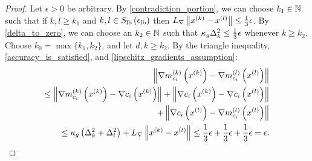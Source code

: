


\begin{proof}

Let $\epsilon > 0$ be arbitrary.
By \cref{contradiction_portion}, we can choose $k_1 \in \mathbb N$ such that if $k, l \ge k_1$ and
$k, l \in {S_{\textrm{lb}}\left(\epsilon_{\textrm{lb}}\right)}$ then ${L_{\nabla}} \left\|x^{(k)} - {x^{(l)}} \right\| \le \frac 1 3 \epsilon$.
By \cref{delta_to_zero}, we can choose an $k_2 \in \mathbb N$ such that $\kappa_g \Delta_k^2 \le \frac 1 3 \epsilon $ whenever $k \ge k_2$.
Choose $k_0 = \max\{k_1, k_2\}$, and let $d, k \ge k_2$.
By the triangle inequality, \cref{accuracy_is_satisfied}, and \cref{lipschitz_gradients_assumption}:
\begin{align*}
\left\|\nabla {{m}^{(k)}_{c_i}}\left(x^{(k)}\right) - \nabla {{m}^{(l)}_{c_i}}\left({x^{(l)}}\right) \right\| \\
\le 
\left\|\nabla {{m}^{(k)}_{c_i}}\left(x^{(k)}\right) - \nabla c_i\left(x^{(k)}\right) \right\|
+ \left\|\nabla c_i\left(x^{(k)}\right) - \nabla c_i\left({x^{(l)}}\right)\right\| \\
+ \left \| \nabla c_i\left({x^{(l)}}\right) - \nabla {{m}^{(l)}_{c_i}}\left({x^{(l)}}\right) \right \| \\
\le \kappa_g \left(\Delta_k^2 + \Delta_l^2\right) + {L_{\nabla}} \left\|x^{(k)} - {x^{(l)}} \right\|
\le \frac 1 3 \epsilon + \frac 1 3 \epsilon + \frac 1 3 \epsilon = \epsilon.
\end{align*}
\end{proof}





